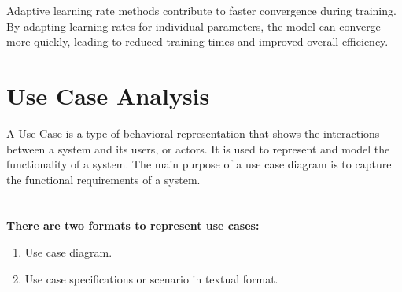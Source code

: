 Adaptive learning rate methods contribute to faster convergence during training. By adapting learning rates for individual parameters, the model can converge more quickly, leading to reduced training times and improved overall efficiency.
\section{Use Case Analysis}
A Use Case is a type of behavioral representation that shows the interactions
between a system and its users, or actors. It is used to represent and model the
functionality of a system. The main purpose of a use case diagram is to capture
the functional requirements of a system. 
\\ \\ \\
\textbf{There are two formats to represent use cases:}
\begin{enumerate}
    \item Use case diagram.
    \item Use case specifications or scenario in textual format.
\end{enumerate}

\newpage

